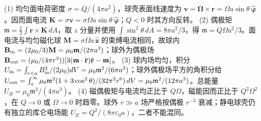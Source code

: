 (1) 均匀面电荷密度 \(\sigma=Q/(4\pi a^2)\)，球壳表面线速度为 \(\mathbf v=\boldsymbol\Omega\times\mathbf r=\Omega a\sin\theta\,\hat{\boldsymbol\varphi}\)。因而面电流 \(\mathbf K=\sigma\mathbf v=\sigma\Omega a\sin\theta\,\hat{\boldsymbol\varphi}\)；\(Q<0\) 时其方向反转。
(2) 偶极矩 \(\boldsymbol{\mathfrak m}=\frac12\int\mathbf r\times\mathbf K\,dA\)，取 \(z\) 分量并使用 \(\int\sin^2\theta\,dA=8\pi a^2/3\)，得 \(\mathfrak m=Q\Omega a^2/3\)。面电流与均匀磁化球 \(\mathbf M=\sigma\Omega a\,\hat{\mathbf z}\) 的束缚电流相同，故球内 \(\mathbf B_{\rm in}=(2\mu_0/3)\mathbf M=\mu_0\boldsymbol{\mathfrak m}/(2\pi a^3)\)；球外为偶极场 \(\mathbf B_{\rm out}=(\mu_0/(4\pi r^3))[3(\boldsymbol{\mathfrak m}\cdot\hat{\mathbf r})\hat{\mathbf r}-\boldsymbol{\mathfrak m}]\)。
(3) 球内场均匀，积分 \(U_{\rm in}=\int_{r<a}B_{\rm in}^2/(2\mu_0)dV=\mu_0\mathfrak m^2/(6\pi a^3)\)；球外偶极场平方的角积分给 \(U_{\rm out}=\int_a^\infty\mu_0\mathfrak m^2(1+3\cos^2\theta)/(32\pi^2r^6)\,dV=\mu_0\mathfrak m^2/(12\pi a^3)\)。总能量 \(U_B=\mu_0\mathfrak m^2/(4\pi a^3)\)。
(4) 磁偶极矩与电流均正比于 \(Q\Omega\)，磁能因而正比于 \(Q^2\Omega^2\)，在 \(Q\to0\) 或 \(\Omega\to0\) 时趋零。球外 \(r\gg a\) 场严格按偶极 \(r^{-3}\) 衰减；静电球壳仍有独立的库仑电场能 \(U_E=Q^2/(8\pi\varepsilon_0 a)\)，二者不能混同。
